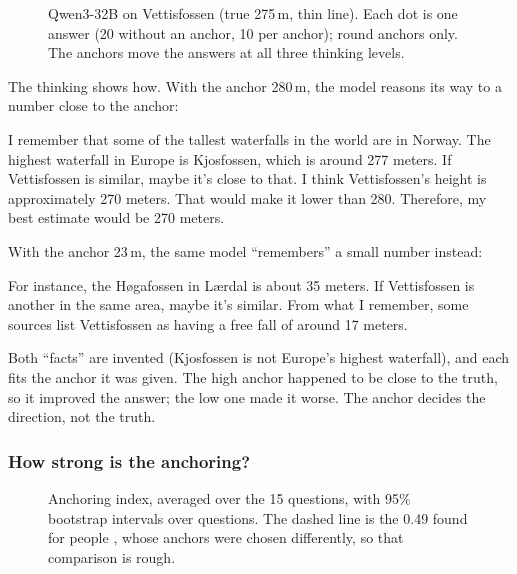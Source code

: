 \documentclass[11pt,a4paper]{article}
\begin{document}
\begin{figure}[ht]
\centering{}
\caption{Qwen3-32B on Vettisfossen (true 275\,m, thin line). Each dot is one answer (20 without an anchor, 10 per anchor); round anchors only. The anchors move the answers at all three thinking levels.}
\label{e6:fig:vettis}
\end{figure}

The thinking shows how. With the anchor 280\,m, the model reasons its way to a number close to the anchor:

\begin{transcript}
\cut{} I remember that some of the tallest waterfalls in the world are in Norway. \cut{} The highest waterfall in Europe is Kjosfossen, which is around 277 meters. If Vettisfossen is similar, maybe it's close to that. \cut{} I think Vettisfossen's height is approximately 270 meters. That would make it lower than 280. \cut{} Therefore, my best estimate would be 270 meters.
\end{transcript}

With the anchor 23\,m, the same model \enquote{remembers} a small number instead:

\begin{transcript}
\cut{} For instance, the Høgafossen in Lærdal is about 35 meters. If Vettisfossen is another in the same area, maybe it's similar. \cut{} From what I remember, some sources list Vettisfossen as having a free fall of around 17 meters.
\end{transcript}

Both \enquote{facts} are invented (Kjosfossen is not Europe's highest waterfall), and each fits the anchor it was given. The high anchor happened to be close to the truth, so it improved the answer; the low one made it worse. The anchor decides the direction, not the truth.

\subsubsection{How strong is the anchoring?}

\begin{figure}[ht]
\centering{}
\caption{Anchoring index, averaged over the 15 questions, with 95\% bootstrap intervals over questions. The dashed line is the 0.49 found for people \citep{jacowitz1995measures}, whose anchors were chosen differently, so that comparison is rough.}
\label{e6:fig:index}
\end{figure}
\end{document}
